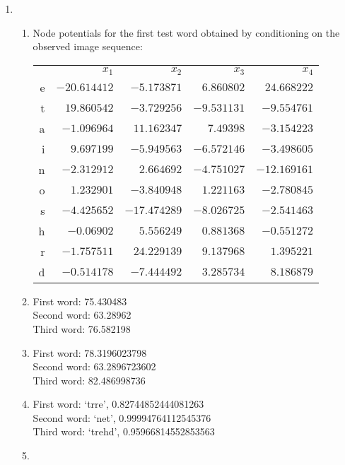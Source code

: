 \documentclass[12pt]{article}
\begin{document}
\begin{enumerate}

\item %
\begin{enumerate}
\item %
Node potentials for the first test word obtained by conditioning on the observed image sequence:
\begin{center}
\begin{tabular}{rrrrr}
& $x_1$ & $x_2$ & $x_3$ & $x_4$ \\
e & $-20.614412$ & $-5.173871$ & $6.860802$ & $24.668222$ \\
t & $19.860542$ & $-3.729256$ & $-9.531131$ & $-9.554761$ \\
a & $-1.096964$ & $11.162347$ & $7.49398$ & $ -3.154223$ \\
i & $9.697199$ & $-5.949563$ & $-6.572146$ & $-3.498605$ \\
n & $-2.312912$ & $2.664692$ & $-4.751027$ & $-12.169161$ \\
o & $1.232901$ & $-3.840948$ & $1.221163$ & $-2.780845$ \\
s & $-4.425652$ & $-17.474289$ & $-8.026725$ & $-2.541463$ \\
h & $-0.06902$ & $5.556249$ & $0.881368$ & $-0.551272$ \\
r & $-1.757511$ & $24.229139$ & $9.137968$ & $1.395221$ \\
d & $-0.514178$ & $-7.444492$ & $3.285734$ & $8.186879$
\end{tabular}
\end{center}

\item %
First word: 75.430483\\
Second word: 63.28962\\
Third word: 76.582198

\item %
First word: 78.3196023798\\
Second word: 63.2896723602\\
Third word: 82.486998736

\item %
First word: `trre', 0.82744852444081263\\
Second word: `net', 0.99994764112545376\\
Third word: `trehd', 0.95966814552853563

\item %


\end{enumerate}


\end{enumerate}
\end{document}
